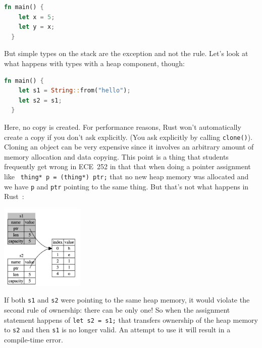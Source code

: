 \begin{lstlisting}[language=Rust]
  fn main() {
   	let x = 5;
	let y = x;
  }
\end{lstlisting}

But simple types on the stack are the exception and not the rule. Let's look at what happens with types with a heap component, though:

\begin{lstlisting}[language=Rust]
  fn main() {
    let s1 = String::from("hello");
    let s2 = s1;
  }
\end{lstlisting}

Here, no copy is created. For performance reasons, Rust won't automatically create a copy if you don't ask explicitly. (You ask explicitly by calling \texttt{clone()}). Cloning an object can be very expensive since it involves an arbitrary amount of memory allocation and data copying. This point is a thing that students frequently get wrong in ECE~252 in that that when doing a pointer assignment like \texttt{ thing* p = (thing*) ptr;} that no new heap memory was allocated and we have \texttt{p} and \texttt{ptr} pointing to the same thing. But that's not what happens in Rust~\cite{rustdocs}:

\begin{center}
\includegraphics[width=0.3\textwidth]{images/string-rust.png}
\end{center}

If both \texttt{s1} and \texttt{s2} were pointing to the same heap memory, it would violate the second rule of ownership: there can be only one! So when the assignment statement happens of \texttt{let s2 = s1;} that transfers ownership of the heap memory to \texttt{s2} and then \texttt{s1} is no longer valid. An attempt to use it will result in a compile-time error. 


